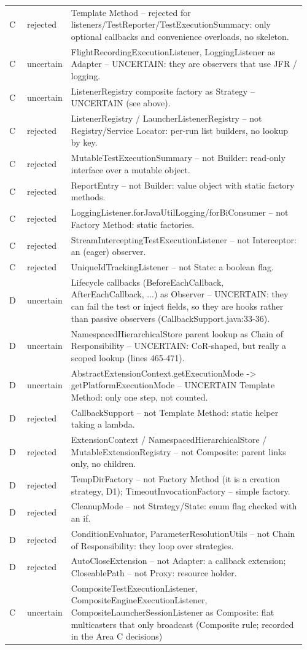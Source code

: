\documentclass[11pt,a4paper]{article}
\begin{document}
\begin{longtable}{@{}p{0.06\linewidth}p{0.11\linewidth}p{0.79\linewidth}@{}}
C & rejected & Template Method -- rejected for listeners/TestReporter/TestExecutionSummary: only optional callbacks and convenience overloads, no skeleton.\\
C & uncertain & FlightRecordingExecutionListener, LoggingListener as Adapter -- UNCERTAIN: they are observers that use JFR / logging.\\
C & uncertain & ListenerRegistry composite factory as Strategy -- UNCERTAIN (see above).\\
C & rejected & ListenerRegistry / LauncherListenerRegistry -- not Registry/Service Locator: per-run list builders, no lookup by key.\\
C & rejected & MutableTestExecutionSummary -- not Builder: read-only interface over a mutable object.\\
C & rejected & ReportEntry -- not Builder: value object with static factory methods.\\
C & rejected & LoggingListener.forJavaUtilLogging/forBiConsumer -- not Factory Method: static factories.\\
C & rejected & StreamInterceptingTestExecutionListener -- not Interceptor: an (eager) observer.\\
C & rejected & UniqueIdTrackingListener -- not State: a boolean flag.\\
D & uncertain & Lifecycle callbacks (BeforeEachCallback, AfterEachCallback, ...) as Observer -- UNCERTAIN: they can fail the test or inject fields, so they are hooks rather than passive observers (CallbackSupport.java:33-36).\\
D & uncertain & NamespacedHierarchicalStore parent lookup as Chain of Responsibility -- UNCERTAIN: CoR-shaped, but really a scoped lookup (lines 465-471).\\
D & uncertain & AbstractExtensionContext.getExecutionMode -\textgreater{} getPlatformExecutionMode -- UNCERTAIN Template Method: only one step, not counted.\\
D & rejected & CallbackSupport -- not Template Method: static helper taking a lambda.\\
D & rejected & ExtensionContext / NamespacedHierarchicalStore / MutableExtensionRegistry -- not Composite: parent links only, no children.\\
D & rejected & TempDirFactory -- not Factory Method (it is a creation strategy, D1); TimeoutInvocationFactory -- simple factory.\\
D & rejected & CleanupMode -- not Strategy/State: enum flag checked with an if.\\
D & rejected & ConditionEvaluator, ParameterResolutionUtils -- not Chain of Responsibility: they loop over strategies.\\
D & rejected & AutoCloseExtension -- not Adapter: a callback extension; CloseablePath -- not Proxy: resource holder.\\
C & uncertain & CompositeTestExecutionListener, CompositeEngineExecutionListener, CompositeLauncherSessionListener as Composite: flat multicasters that only broadcast (Composite rule; recorded in the Area C decisions)\\
\bottomrule\end{longtable}
\end{document}
